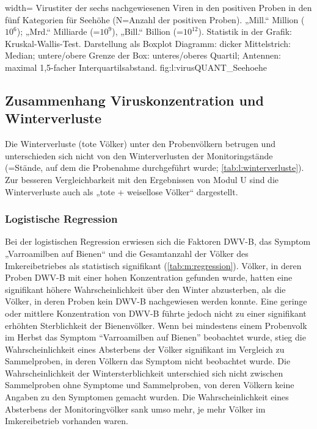   
  {width=\textwidth} %
  {Virustiter der sechs nachgewiesenen Viren in den positiven Proben in den fünf Kategorien für Seehöhe (N=Anzahl der positiven Proben). „Mill.“ Million ($10^6$); „Mrd.“ Milliarde (=$10^9$), „Bill.“ Billion (=$10^{12}$). Statistik in der Grafik: Kruskal-Wallis-Test. Darstellung als Boxplot Diagramm: dicker Mittelstrich: Median; untere/obere Grenze der Box: unteres/oberes Quartil; Antennen: maximal 1,5-facher Interquartilsabstand.} %
  {} %
  {fig:l:virusQUANT_Seehoehe} %
  
  
  
 \subsection{Zusammenhang Viruskonzentration und Winterverluste}
  
Die Winterverluste (tote Völker) unter den Probenvölkern betrugen  und unterschieden sich nicht von den Winterverlusten der Monitoringstände (=Stände, auf dem die Probenahme durchgeführt wurde; \cref{tab:l:winterverluste}). Zur besseren Vergleichbarkeit mit den Ergebnissen von Modul U sind die Winterverluste auch als „tote + weisellose Völker“ dargestellt.
  

  
\subsubsection{Logistische Regression}

Bei der logistischen Regression erwiesen sich die Faktoren DWV-B, das Symptom „Varroamilben auf Bienen“ und die Gesamtanzahl der Völker des Imkereibetriebes als statistisch signifikant (\cref{tab:m:regression}). Völker, in deren Proben DWV-B mit einer hohen Konzentration gefunden wurde, hatten eine signifikant höhere Wahrscheinlichkeit über den Winter abzusterben, als die Völker, in deren Proben kein DWV-B nachgewiesen werden konnte. Eine geringe oder mittlere Konzentration von DWV-B führte jedoch nicht zu einer signifikant erhöhten Sterblichkeit der Bienenvölker. Wenn bei mindestens einem Probenvolk im Herbst das Symptom \enquote{Varroamilben auf Bienen} beobachtet wurde, stieg die Wahrscheinlichkeit eines Absterbens der Völker signifikant im Vergleich zu Sammelproben, in deren Völkern das Symptom nicht beobachtet wurde. Die Wahrscheinlichkeit der Wintersterblichkeit unterschied sich nicht zwischen Sammelproben ohne Symptome und Sammelproben, von deren Völkern keine Angaben zu den Symptomen gemacht wurden. Die Wahrscheinlichkeit eines Absterbens der Monitoringvölker sank umso mehr, je mehr Völker im Imkereibetrieb vorhanden waren. 

